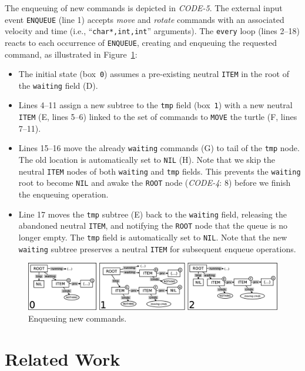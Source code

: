 \documentclass{sig-alternate}
\newcommand{\code}[1] {{\small{\texttt{#1}}}}
\newcommand{\MM}[1] {\textcircled{\tiny{\textsf{#1}}}}
\begin{document}
The enqueuing of new commands is depicted in \emph{CODE-5}.
The external input event \code{ENQUEUE} (line 1) accepts \emph{move} and 
\emph{rotate} commands with an associated velocity and time (i.e., 
``\code{char*,int,int}'' arguments).
The \code{every} loop (lines 2--18) reacts to each occurrence of 
\code{ENQUEUE}, creating and enqueuing the requested command, as illustrated in 
Figure~\ref{fig.queue-2}: 
%
\begin{itemize}
%
\item The initial state (box~\code{0}) assumes a pre-existing neutral 
\code{ITEM} in the root of the \code{waiting} field (\MM{D}).
%
\item Lines 4--11 assign a new subtree to the \code{tmp} field (box~\code{1}) 
with a new neutral \code{ITEM} (\MM{E}, lines 5--6) linked to the set of 
commands to \code{MOVE} the turtle (\MM{F}, lines 7--11).
%
\item Lines 15--16 move the already \code{waiting} commands (\MM{G}) to 
tail of the \code{tmp} node.
The old location is automatically set to \code{NIL} (\MM{H}).
Note that we skip the neutral \code{ITEM} nodes of both \code{waiting} and 
\code{tmp} fields.
This prevents the \code{waiting} root to become \code{NIL} and awake the 
\code{ROOT} node (\emph{CODE-4}: 8) before we finish the enqueuing operation.
%
\item Line 17 moves the \code{tmp} subtree (\MM{E}) back to the 
\code{waiting} field, releasing the abandoned neutral \code{ITEM}, and 
notifying the \code{ROOT} node that the queue is no longer empty.
The \code{tmp} field is automatically set to \code{NIL}.
Note that the new \code{waiting} subtree preserves a neutral \code{ITEM} for 
subsequent enqueue operations.
%
\end{itemize}

\begin{figure}[t]
\centering
\includegraphics[scale=0.24]{queue-fig-2.eps}
\caption{
Enqueuing new commands.
\label{fig.queue-2}
}
\end{figure}

\section{Related Work}
\label{sec.related}
\end{document}
